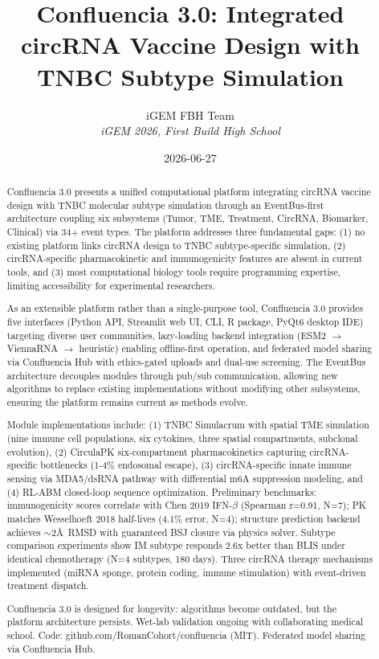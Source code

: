 \documentclass[12pt]{article}
\title{Confluencia 3.0: Integrated circRNA Vaccine Design with TNBC Subtype Simulation}
\author{
iGEM FBH Team\\
\textit{iGEM 2026, First Build High School}
}
\date{2026-06-27}
\begin{document}
\maketitle

\begin{abstract}
Confluencia 3.0 presents a unified computational platform integrating circRNA vaccine design with TNBC molecular subtype simulation through an EventBus-first architecture coupling six subsystems (Tumor, TME, Treatment, CircRNA, Biomarker, Clinical) via 34+ event types. The platform addresses three fundamental gaps: (1) no existing platform links circRNA design to TNBC subtype-specific simulation, (2) circRNA-specific pharmacokinetic and immunogenicity features are absent in current tools, and (3) most computational biology tools require programming expertise, limiting accessibility for experimental researchers.

As an extensible platform rather than a single-purpose tool, Confluencia 3.0 provides five interfaces (Python API, Streamlit web UI, CLI, R package, PyQt6 desktop IDE) targeting diverse user communities, lazy-loading backend integration (ESM2 $\rightarrow$ ViennaRNA $\rightarrow$ heuristic) enabling offline-first operation, and federated model sharing via Confluencia Hub with ethics-gated uploads and dual-use screening. The EventBus architecture decouples modules through pub/sub communication, allowing new algorithms to replace existing implementations without modifying other subsystems, ensuring the platform remains current as methods evolve.

Module implementations include: (1) TNBC Simulacrum with spatial TME simulation (nine immune cell populations, six cytokines, three spatial compartments, subclonal evolution), (2) CirculaPK six-compartment pharmacokinetics capturing circRNA-specific bottlenecks (1-4\% endosomal escape), (3) circRNA-specific innate immune sensing via MDA5/dsRNA pathway with differential m6A suppression modeling, and (4) RL-ABM closed-loop sequence optimization. Preliminary benchmarks: immunogenicity scores correlate with Chen 2019 IFN-$\beta$ (Spearman r=0.91, N=7); PK matches Wesselhoeft 2018 half-lives (4.1\% error, N=4); structure prediction backend achieves $\sim$2\AA\ RMSD with guaranteed BSJ closure via physics solver. Subtype comparison experiments show IM subtype responds 2.6x better than BLIS under identical chemotherapy (N=4 subtypes, 180 days). Three circRNA therapy mechanisms implemented (miRNA sponge, protein coding, immune stimulation) with event-driven treatment dispatch.

Confluencia 3.0 is designed for longevity: algorithms become outdated, but the platform architecture persists. Wet-lab validation ongoing with collaborating medical school. Code: github.com/RomanCohort/confluencia (MIT). Federated model sharing via Confluencia Hub.
\end{abstract}
\end{document}
